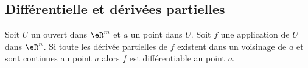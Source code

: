   \subsection{Différentielle et dérivées partielles}

\begin{proposition}		\label{Diff_totale}
 Soit $U$ un ouvert dans $\eR^m$ et $a$ un point dans $U$. Soit $f$ une application de $U$ dans $\eR^n$. Si toute les dérivée partielles de $f$ existent dans un voisinage de $a$ et sont continues au point $a$ alors $f$ est différentiable au point $a$.
\end{proposition}
